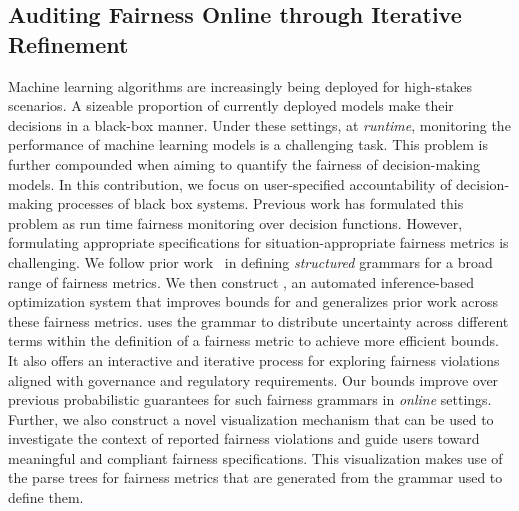 \subsection{Auditing Fairness Online through Iterative Refinement}
Machine learning algorithms are increasingly being deployed for high-stakes scenarios. 
A sizeable proportion of currently deployed models make their decisions in a black-box manner. 
Under these settings, at \textit{runtime}, monitoring the performance of machine learning models is a challenging task.
This problem is further compounded when aiming to quantify the fairness of decision-making models.
In this contribution, we focus on user-specified accountability of decision-making processes of black box systems.
Previous work has formulated this problem as run time fairness monitoring over decision functions.
However, formulating appropriate specifications for situation-appropriate fairness metrics is challenging.
We follow prior work~\citep{albarghouthi2019fairness,bastani2019probabilistic} in defining \textit{structured} grammars for a broad range of fairness metrics.
We then construct \AVOIRmethodname{}, an automated inference-based optimization system that improves bounds for and generalizes prior work across these fairness metrics.
\AVOIRmethodname{} uses the grammar to distribute uncertainty across different terms within the definition of a fairness metric to achieve more efficient bounds.
It also offers an interactive and iterative process for exploring fairness violations aligned with governance and regulatory requirements.
Our bounds improve over previous probabilistic guarantees for such fairness grammars in \textit{online} settings.
Further, we also construct a novel visualization mechanism that can be used to investigate the context of reported fairness violations and guide users toward meaningful and compliant fairness specifications.
This visualization makes use of the parse trees for fairness metrics that are generated from the grammar used to define them.

